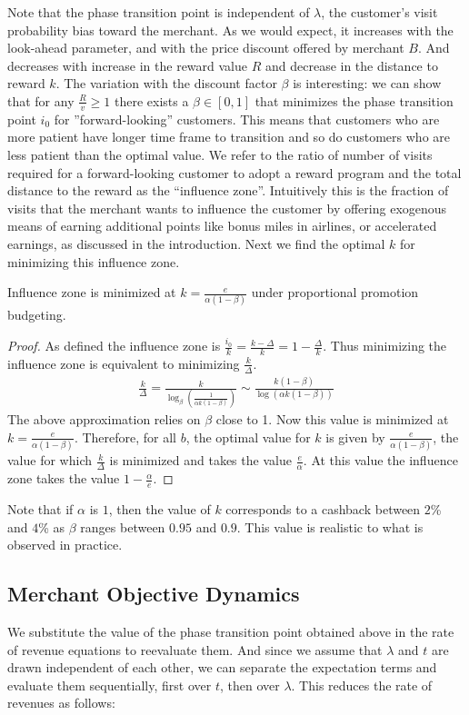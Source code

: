 Note that the phase transition point is independent of $\lambda$, the customer's visit probability bias toward the merchant.
As we would expect, it increases with the look-ahead parameter, and with the price discount offered by merchant $B$.
And decreases with increase in the reward value $R$ and decrease in the distance to reward $k$.
The variation with the discount factor $\beta$ is interesting: we can show that for any $\frac{R}{v} \ge 1$ there exists a $\beta \in [0,1]$ that minimizes the phase transition point $i_0$ for ''forward-looking'' customers.
This means that customers who are more patient have longer time frame to transition and so do customers who are less patient than the optimal value.
We refer to the ratio of number of visits required for a forward-looking customer to adopt a reward program and the total distance to the reward as the ``influence zone''.
Intuitively this is the fraction of visits that the merchant wants to influence the customer by offering exogenous means of earning additional points like bonus miles in airlines, or accelerated earnings, as discussed in the introduction.
Next we find the optimal $k$ for minimizing this influence zone.

\begin{remark}\label{rem:inf_zone}
Influence zone is minimized at $k = \frac{e}{\alpha(1-\beta)}$ under proportional promotion budgeting. 
\end{remark}
\begin{proof}
As defined the influence zone is $\frac{i_0}{k} = \frac{k-\Delta}{k} = 1 -\frac{\Delta}{k}$.
Thus minimizing the influence zone is equivalent to minimizing $\frac{k}{\Delta}$.
\begin{align*}
\frac{k}{\Delta} = \frac{k}{\log_\beta\left(\frac{1}{\alpha k(1-\beta)}\right)} \sim \frac{k(1-\beta)}{\log (\alpha k(1-\beta))} 
\end{align*}
The above approximation relies on $\beta$ close to 1. Now this value is minimized at $k = \frac{e}{\alpha(1-\beta)}$. Therefore, for all $b$, the optimal value for $k$ is given by $\frac{e}{\alpha(1-\beta)}$, the value for which $\frac{k}{\Delta}$ is minimized and takes the value $\frac{e}{\alpha}$. 
At this value the influence zone takes the value $1-\frac{\alpha}{e}$.
\end{proof}
Note that if $\alpha$ is $1$, then the value of $k$ corresponds to a cashback between $2$\% and $4$\% as $\beta$ ranges between $0.95$ and $0.9$.
This value is realistic to what is observed in practice.

\subsection{Merchant Objective Dynamics}
We substitute the value of the phase transition point obtained above in the rate of revenue equations to reevaluate them. 
And since we assume that $\lambda$ and $t$ are drawn independent of each other, we can separate the expectation terms and evaluate them sequentially, first over $t$, then over $\lambda$. This reduces the rate of revenues as follows:


